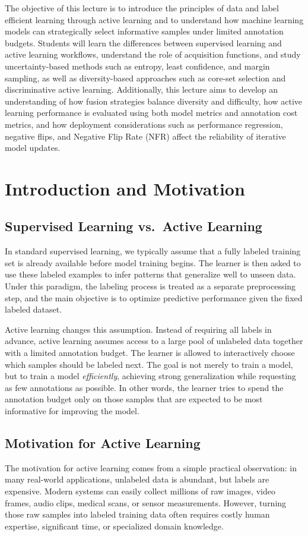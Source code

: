 \documentclass{article}
\begin{document}
The objective of this lecture is to introduce the principles of data and label efficient learning through active learning and to understand how machine learning models can strategically select informative samples under limited annotation budgets. Students will learn the differences between supervised learning and active learning workflows, understand the role of acquisition functions, and study uncertainty-based methods such as entropy, least confidence, and margin sampling, as well as diversity-based approaches such as core-set selection and discriminative active learning. Additionally, this lecture aims to develop an understanding of how fusion strategies balance diversity and difficulty, how active learning performance is evaluated using both model metrics and annotation cost metrics, and how deployment considerations such as performance regression, negative flips, and Negative Flip Rate (NFR) affect the reliability of iterative model updates.

\section{Introduction and Motivation}

\subsection{Supervised Learning vs.\ Active Learning}
In standard supervised learning, we typically assume that a fully labeled training set is already available before model training begins. The learner is then asked to use these labeled examples to infer patterns that generalize well to unseen data. Under this paradigm, the labeling process is treated as a separate preprocessing step, and the main objective is to optimize predictive performance given the fixed labeled dataset.

Active learning changes this assumption. Instead of requiring all labels in advance, active learning assumes access to a large pool of unlabeled data together with a limited annotation budget. The learner is allowed to interactively choose which samples should be labeled next. The goal is not merely to train a model, but to train a model \emph{efficiently}, achieving strong generalization while requesting as few annotations as possible. In other words, the learner tries to spend the annotation budget only on those samples that are expected to be most informative for improving the model.

\subsection{Motivation for Active Learning}
The motivation for active learning comes from a simple practical observation: in many real-world applications, unlabeled data is abundant, but labels are expensive. Modern systems can easily collect millions of raw images, video frames, audio clips, medical scans, or sensor measurements. However, turning those raw samples into labeled training data often requires costly human expertise, significant time, or specialized domain knowledge.
\end{document}
